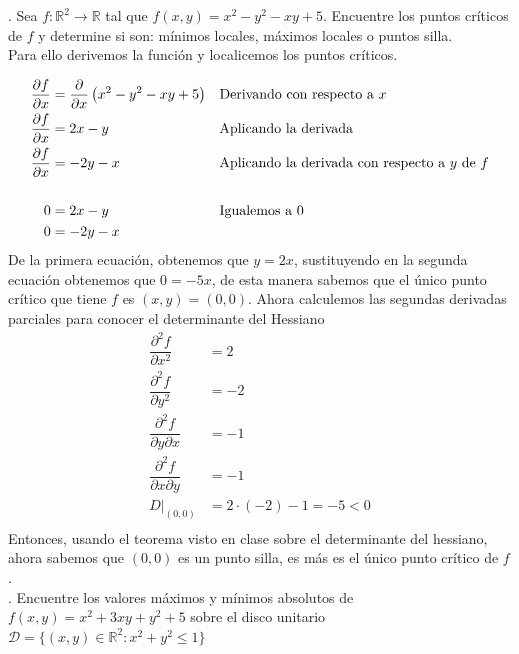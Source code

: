 \documentclass[letterpaper]{article}
\renewcommand{\d}{\partial}
\renewcommand{\*}{\cdot}
\theoremstyle{definition}
\begin{document}
. Sea $f: \mathbb{R}^2 \longrightarrow \mathbb{R}$ tal que  $f(x,y) = x^2 - y^2 - xy + 5$. Encuentre los puntos críticos de $f$ y determine si son: mínimos locales, máximos locales o puntos silla.\\
Para ello derivemos la función y localicemos los puntos críticos.

\begin{align*}
	\dfrac{\d f}{\d x} &= \dfrac{\d }{\d x}\left( x^2 - y^2 - xy + 5 \right) &&\text{Derivando con respecto a }x\\
	\dfrac{\d f}{\d x} &= 2x-y &&\text{Aplicando la derivada}\\
	\dfrac{\d f}{\d x} &= -2y-x &&\text{Aplicando la derivada con respecto a $ y $ de }f\\
	\\
	0 &= 2x-y &&\text{Igualemos a }0\\
	0 &= -2y - x &&\text{ }\\
\end{align*}
De la primera ecuación, obtenemos que $ y = 2x $, sustituyendo en la segunda ecuación obtenemos que $ 0 = -5x $, de esta manera sabemos que el único punto crítico que tiene $ f $ es $ (x,y) = (0,0) $. Ahora calculemos las segundas derivadas parciales para conocer el determinante del Hessiano
\begin{align*}
	\dfrac{\d^2 f}{\d x^2} &= 2\\
	\dfrac{\d^2 f}{\d y^2} &= -2\\
	\dfrac{\d^2 f}{\d y \d x} &= -1\\
	\dfrac{\d^2 f}{\d x \d y} &= -1\\
	D\Bigr|_{(0,0)} &= 2 \* (-2) - 1 = -5 < 0\\
\end{align*}
Entonces, usando el teorema visto en clase sobre el determinante del hessiano, ahora sabemos que $ (0,0) $ es un punto silla, es más es el único punto crítico de $ f $.\\


. Encuentre los valores máximos y mínimos absolutos de $f(x,y) = x^2 + 3xy + y^2 + 5$ sobre el disco unitario $\mathcal{D} = \{(x,y) \in \mathbb{R}^2 : x^2 + y^2 \leq 1 \}$\\
\end{document}
